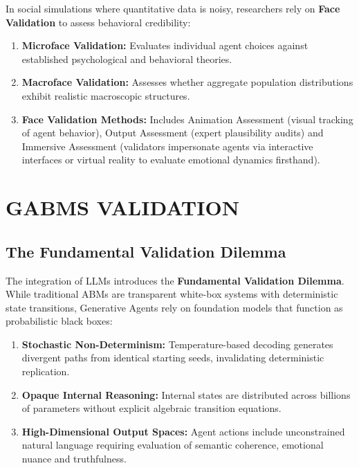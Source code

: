 \documentclass[12pt,a4paper]{report}
\begin{document}
In social simulations where quantitative data is noisy, researchers rely on \textbf{Face Validation} to assess behavioral credibility:
\begin{enumerate}[label=\arabic*.]
    \item \textbf{Microface Validation:} Evaluates individual agent choices against established psychological and behavioral theories.
    \item \textbf{Macroface Validation:} Assesses whether aggregate population distributions exhibit realistic macroscopic structures.
    \item \textbf{Face Validation Methods:} Includes Animation Assessment (visual tracking of agent behavior), Output Assessment (expert plausibility audits) and Immersive Assessment (validators impersonate agents via interactive interfaces or virtual reality to evaluate emotional dynamics firsthand).
\end{enumerate}


\chapter{GABMS VALIDATION}
\label{chap:gabms_validation}

\section{The Fundamental Validation Dilemma}
\label{sec:black_box_dilemma}

The integration of LLMs introduces the \textbf{Fundamental Validation Dilemma}. While traditional ABMs are transparent white-box systems with deterministic state transitions, Generative Agents rely on foundation models that function as probabilistic black boxes:
\begin{enumerate}[label=\arabic*.]
    \item \textbf{Stochastic Non-Determinism:} Temperature-based decoding generates divergent paths from identical starting seeds, invalidating deterministic replication.
    \item \textbf{Opaque Internal Reasoning:} Internal states are distributed across billions of parameters without explicit algebraic transition equations.
    \item \textbf{High-Dimensional Output Spaces:} Agent actions include unconstrained natural language requiring evaluation of semantic coherence, emotional nuance and truthfulness.
\end{enumerate}
\end{document}
